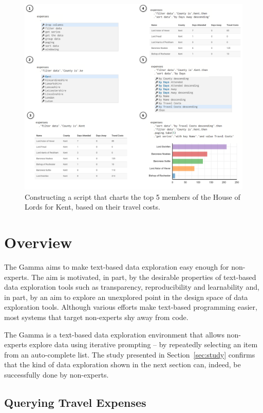 \documentclass[manuscript,review,anonymous]{acmart}
\begin{document}
\begin{figure}[b]
\includegraphics[width=0.94\columnwidth]{figures/thegamma-walk}
\caption{Constructing a script that charts the top 5 members of the House of Lords for Kent, based
on their travel costs.}
\label{fig:walkthrough}
\end{figure}


\section{Overview}
\label{sec:overview}

The Gamma aims to make text-based data exploration easy enough for non-experts. The aim is
motivated, in part, by the desirable properties of text-based data exploration tools such
as transparency, reproducibility and learnability and, in part, by an aim to explore an
unexplored point in the design space of data exploration tools. Although various efforts
make text-based programming easier, most systems that target non-experts shy away from code.

The Gamma is a text-based data exploration environment that allows non-experts explore data using
iterative prompting -- by repeatedly selecting an item from an auto-complete list. The study
presented in Section~\ref{sec:study} confirms that the kind of data exploration shown in the next
section can, indeed, be successfully done by non-experts.
%
\subsection{Querying Travel Expenses}
\label{sec:overview-walk}
\end{document}
